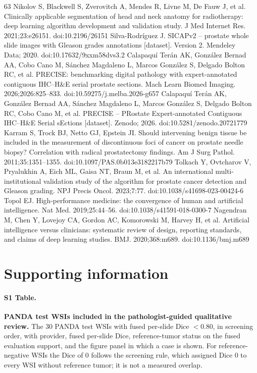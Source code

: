 \documentclass[10pt,letterpaper]{article}
\begin{document}
\begin{thebibliography}{63}
 Nikolov S, Blackwell S, Zverovitch A, Mendes R, Livne M, De Fauw J, et al. Clinically applicable segmentation of head and neck anatomy for radiotherapy: deep learning algorithm development and validation study. J Med Internet Res. 2021;23:e26151. doi:10.2196/26151
 Silva-Rodr\'iguez J. SICAPv2 -- prostate whole slide images with Gleason grades annotations [dataset]. Version 2. Mendeley Data; 2020. doi:10.17632/9xxm58dvs3.2
 Calapaqu\'i Ter\'an AK, Gonz\'alez Bernad AA, Cobo Cano M, S\'anchez Magdaleno L, Marcos Gonz\'alez S, Delgado Bolton RC, et al. PRECISE: benchmarking digital pathology with expert-annotated contiguous IHC--H\&E serial prostate sections. Mach Learn Biomed Imaging. 2026;2026:825--833. doi:10.59275/j.melba.2026-g657
 Calapaqu\'i Ter\'an AK, Gonz\'alez Bernad AA, S\'anchez Magdaleno L, Marcos Gonz\'alez S, Delgado Bolton RC, Cobo Cano M, et al. PRECISE -- PRostate Expert-annotated Contiguous IHC--H\&E Serial sEctions [dataset]. Zenodo; 2026. doi:10.5281/zenodo.20721779
 Karram S, Trock BJ, Netto GJ, Epstein JI. Should intervening benign tissue be included in the measurement of discontinuous foci of cancer on prostate needle biopsy? Correlation with radical prostatectomy findings. Am J Surg Pathol. 2011;35:1351--1355. doi:10.1097/PAS.0b013e3182217b79
 Tolkach Y, Ovtcharov V, Pryalukhin A, Eich ML, Gaisa NT, Braun M, et al. An international multi-institutional validation study of the algorithm for prostate cancer detection and Gleason grading. NPJ Precis Oncol. 2023;7:77. doi:10.1038/s41698-023-00424-6
 Topol EJ. High-performance medicine: the convergence of human and artificial intelligence. Nat Med. 2019;25:44--56. doi:10.1038/s41591-018-0300-7
 Nagendran M, Chen Y, Lovejoy CA, Gordon AC, Komorowski M, Harvey H, et al. Artificial intelligence versus clinicians: systematic review of design, reporting standards, and claims of deep learning studies. BMJ. 2020;368:m689. doi:10.1136/bmj.m689
\end{thebibliography}

\section*{Supporting information}

\paragraph*{S1 Table.}
\label{S1_Table}
{\bf PANDA test WSIs included in the pathologist-guided qualitative review.} The 30 PANDA test WSIs with fused per-slide Dice $<0.80$, in screening order, with provider, fused per-slide Dice, reference-tumor status on the fused evaluation support, and the figure panel in which a case is shown. For reference-negative WSIs the Dice of 0 follows the screening rule, which assigned Dice 0 to every WSI without reference tumor; it is not a measured overlap.
\end{document}
